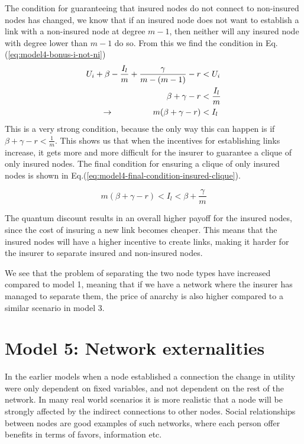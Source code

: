 The condition for guaranteeing that insured nodes do not connect to non-insured nodes has changed, we know that if an insured node does not want to establish a link with a non-insured node at degree $m-1$, then neither will any insured node with degree lower than $m-1$ do so. From this we find the condition in Eq.(\ref{eq:model4-bonus-i-not-ni})
\begin{eqnarray}
U_{i}+\beta-\frac{I_{l}}{m}+\frac{\gamma}{m-(m-1)}-r&<U_{i} \nonumber \\ 
\beta+\gamma-r&<\frac{I_{l}}{m}\nonumber \\ 
\llap{$\rightarrow$\hspace{50pt}}m(\beta +\gamma-r)&<I_{l}\nonumber
\label{eq:model4-bonus-i-not-ni}
\end{eqnarray}
This is a very strong condition, because the only way this can happen is if $\beta+\gamma-r<\frac{1}{m}$.  This shows us that when the incentives for establishing links increase, it gets more and more difficult for the insurer to guarantee a clique of only insured nodes. 
The final condition for ensuring a clique of only insured nodes is shown in Eq.(\ref{eq:model4-final-condition-insured-clique}).

\begin{equation}
m(\beta +\gamma-r)<I_{l}<\beta+\frac{\gamma}{m}
\label{eq:model4-final-condition-insured-clique}
\end{equation}

The quantum discount results in an overall higher payoff for the insured nodes, since the cost of insuring a new link becomes cheaper. This means that the insured nodes will have a higher incentive to create links, making it harder for the insurer to separate insured and non-insured nodes.

We see that the problem of separating the two node types have increased compared to model 1, meaning that if we have a network where the insurer has managed to separate them, the price of anarchy is also higher compared to a similar scenario in model 3. 

\section{Model 5: Network externalities}
In the earlier models when a node established a connection the change in utility were only dependent on fixed variables, and not dependent on the rest of the network. In many real world scenarios it is more realistic that a node will be strongly affected by the indirect connections to other nodes. Social relationships between nodes are good examples of such networks, where each person offer benefits in terms of favors, information etc. 

